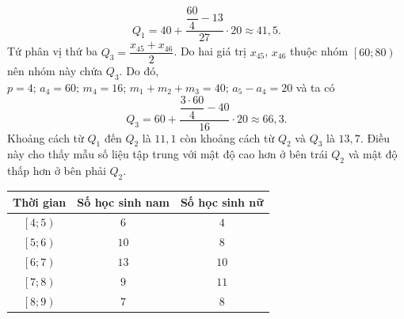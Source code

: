 \begin{bt}[Mức độ 2]
{\begin{enumerate}
			$$Q_1=40+\dfrac{\dfrac{60}{4}-13}{27}\cdot 20\approx 41{,}5.$$
			Tứ phân vị thứ ba $Q_3=\dfrac{x_{45}+x_{46}}{2}$. Do hai giá trị $x_{45}$, $x_{46}$ thuộc nhóm $\left[60;80\right)$ nên nhóm này chứa $Q_3$. Do đó, $p=4;\,a_4=60;\,m_4=16;\,m_1+m_2+m_3=40;\,a_5-a_4=20$ và ta có
			$$Q_3=60+\dfrac{\dfrac{3\cdot 60}{4}-40}{16}\cdot 20\approx 66{,}3.$$
			Khoảng cách từ $Q_1$ đến $Q_2$ là $11{,}1$ còn khoảng cách từ $Q_2$ và $Q_3$ là $13{,}7$. Điều này cho thấy mẫu số liệu tập trung với mật độ cao hơn ở bên trái $Q_2$ và mật độ thấp hơn ở bên phải $Q_2$.
		\end{enumerate}	
	}
\end{bt}

\begin{bt}[Mức độ 3]%
	{
		\begin{tabular}{|c|c|c|}
			\hline
			Thời gian	& Số học sinh nam & Số học sinh nữ\\
			\hline
			$\left[4;5\right)$	& $6$ & $4$\\
			\hline
			$\left[5;6\right)$	& $10$ & $8$\\
			\hline
			$\left[6;7\right)$	& $13$ & $10$\\
			\hline
			$\left[7;8\right)$	& $9$ & $11$\\
			\hline
			$\left[8;9\right)$	& $7$ & $8$\\
			\hline
		\end{tabular}
	}
\end{bt}
